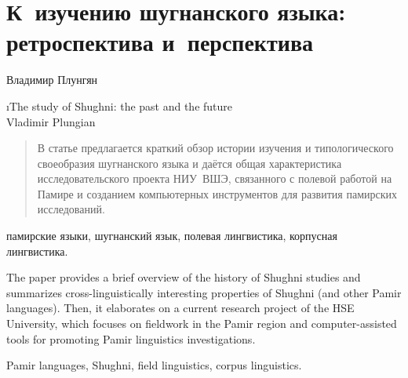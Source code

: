 ﻿\chapter*{К~изучению шугнанского языка: ретроспектива и~перспектива}
\setcounter{section}{0}
\label{chapter-plun-retro}

\begin{customauthorname}
Владимир Плунгян
\end{customauthorname}

\begin{englishtitle}
\i{The study of Shughni: the past and the future\\{\small Vladimir Plungian}}
\end{englishtitle}

\begin{abstract}
В статье предлагается краткий обзор истории изучения и типологического своеобразия шугнанского языка и даётся общая характеристика исследовательского проекта НИУ~ВШЭ, связанного с полевой работой на Памире и созданием компьютерных инструментов для развития памирских исследований.
\end{abstract}

\begin{keywords}
памирские языки, шугнанский язык, полевая лингвистика, корпусная лингвистика.
\end{keywords}

\begin{eng-abstract}
The paper provides a brief overview of the history of Shughni studies and summarizes cross-linguistically interesting properties of Shughni (and other Pamir languages). Then, it elaborates on a current research project of the HSE University, which focuses on fieldwork in the Pamir region and computer-assisted tools for promoting Pamir linguistics investigations.
\end{eng-abstract}

\begin{eng-keywords}
Pamir languages, Shughni, field linguistics, corpus linguistics.
\end{eng-keywords}

\begin{initialprint}
\end{initialprint}

